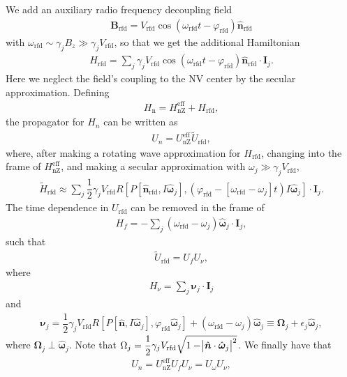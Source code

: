 \documentclass[11pt]{article}
\renewcommand{\t}{\text} %
\newcommand{\f}[2]{\dfrac{#1}{#2}} %
\newcommand{\p}[1]{\left(#1\right)} %
\renewcommand{\sp}[1]{\left[#1\right]} %
\renewcommand{\v}{\bm} %
\newcommand{\uv}[1]{\hat{\v{#1}}} %
\renewcommand{\c}{\cdot} %
\renewcommand{\phi}{\varphi} %
\begin{document}
We add an auxiliary radio frequency decoupling field
\begin{align}
  \v B_{\t{rfd}}
  =V_{\t{rfd}}\cos\p{\omega_{\t{rfd}}t-\phi_{\t{rfd}}}\uv n_{\t{rfd}}
\end{align}
with $\omega_{\t{rfd}}\sim\gamma_jB_z\gg\gamma_jV_{\t{rfd}}$, so that
we get the additional Hamiltonian
\begin{align}
  H_\t{rfd}=\sum_j\gamma_jV_{\t{rfd}}\cos\p{\omega_{\t{rfd}}
    t-\phi_{\t{rfd}}}\uv n_{\t{rfd}}\c\v I_j.
\end{align}
Here we neglect the field's coupling to the NV center by the secular
approximation. Defining
\begin{align}
  H_{\t{n}}=H_{\t{nZ}}^{\t{eff}}+H_{\t{rfd}},
\end{align}
the propagator for $H_n$ can be written as
\begin{align}
  U_n=U_{\t{nZ}}^{\t{eff}}\tilde U_{\t{rfd}},
\end{align}
where, after making a rotating wave approximation for $H_{\t{rfd}}$,
changing into the frame of $H_{\t{nZ}}^{\t{eff}}$, and making a
secular approximation with $\omega_j\gg\gamma_jV_{\t{rfd}}$,
\begin{align}
  \tilde H_{\t{rfd}}\approx\sum_j\f12\gamma_jV_{\t{rfd}} R\sp{P\sp{\uv
      n_{\t{rfd}},I\uv\omega_j},
    \p{\phi_{\t{rfd}}-\sp{\omega_{\t{rfd}}-\omega_j}t}I\uv\omega_j}
  \c\v I_j.
\end{align}
The time dependence in $U_{\t{rfd}}$ can be removed in the frame of
\begin{align}
  H_f=-\sum_j\p{\omega_{\t{rfd}}-\omega_j}\uv\omega_j\c\v I_j,
\end{align}
such that
\begin{align}
  \tilde U_{\t{rfd}}=U_fU_\nu,
\end{align}
where
\begin{align}
  H_\nu=\sum_j\v\nu_j\c\v I_j
\end{align}
and
\begin{align}
  \v\nu_j=\f12\gamma_jV_{\t{rfd}} R\sp{P\sp{\uv n,
      I\uv\omega_j},\phi_{\t{rfd}}\uv\omega_j}
  +\p{\omega_{\t{rfd}}-\omega_j}\uv\omega_j\equiv\v\Omega_j+
  \epsilon_j\uv\omega_j,
\end{align}
where $\v\Omega_j\perp\uv\omega_j$. Note that
$\Omega_j=\f12\gamma_jV_{\t{rfd}}\sqrt{1-\abs{\uv
    n\c\uv\omega_j}^2}$. We finally have that
\begin{align}
  U_n=U_{\t{nZ}}^{\t{eff}}U_fU_\nu=U_\omega U_\nu,
\end{align}
\end{document}
